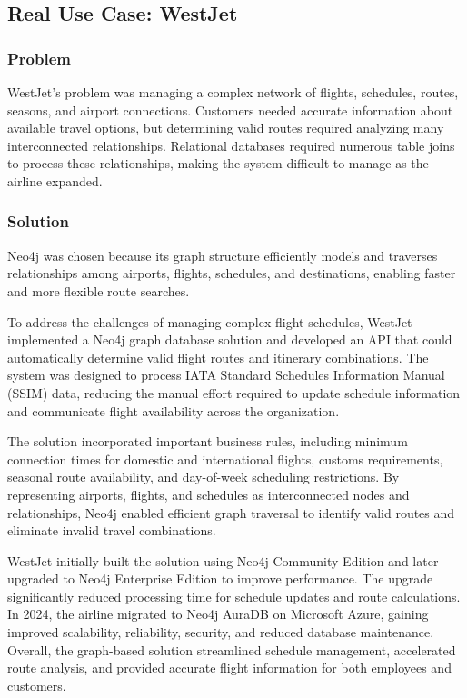\documentclass[11pt,a4paper]{article}
\begin{document}
\subsection{Real Use Case: WestJet}

\subsubsection*{Problem}

WestJet's problem was managing a complex network of flights, schedules, routes, seasons, and airport connections. Customers needed accurate information about available travel options, but determining valid routes required analyzing many interconnected relationships. Relational databases required numerous table joins to process these relationships, making the system difficult to manage as the airline expanded.

\subsubsection*{Solution}

Neo4j was chosen because its graph structure efficiently models and traverses relationships among airports, flights, schedules, and destinations, enabling faster and more flexible route searches.

To address the challenges of managing complex flight schedules, WestJet implemented a Neo4j graph database solution and developed an API that could automatically determine valid flight routes and itinerary combinations. The system was designed to process IATA Standard Schedules Information Manual (SSIM) data, reducing the manual effort required to update schedule information and communicate flight availability across the organization.

The solution incorporated important business rules, including minimum connection times for domestic and international flights, customs requirements, seasonal route availability, and day-of-week scheduling restrictions. By representing airports, flights, and schedules as interconnected nodes and relationships, Neo4j enabled efficient graph traversal to identify valid routes and eliminate invalid travel combinations.

WestJet initially built the solution using Neo4j Community Edition and later upgraded to Neo4j Enterprise Edition to improve performance. The upgrade significantly reduced processing time for schedule updates and route calculations. In 2024, the airline migrated to Neo4j AuraDB on Microsoft Azure, gaining improved scalability, reliability, security, and reduced database maintenance. Overall, the graph-based solution streamlined schedule management, accelerated route analysis, and provided accurate flight information for both employees and customers.
\end{document}
